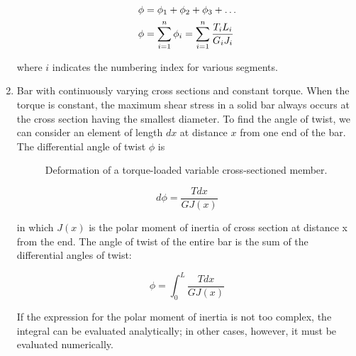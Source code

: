 \documentclass[
10pt,
a4paper,
openany,
svgnames,
]{book} %
\begin{document}
\begin{enumerate}
  \begin{equation}
    \begin{gathered}
      \phi  = {\phi _1} + {\phi _2} + {\phi _3} +  \ldots  \hfill \\
      \phi  = \sum\limits_{i = 1}^n {{\phi _i} = \sum\limits_{i = 1}^n {\dfrac{{{T_i}{L_i}}}{{{G_i}{J_i}}}} }  \hfill \\ 
    \end{gathered}
  \end{equation}
  
  where $i$ indicates the numbering index for various segments.
  
\item Bar with continuously varying cross sections and constant torque. When the torque is constant, the maximum shear stress in a solid bar always occurs at the cross section having the smallest diameter. To find the angle of twist, we can consider an element of length $dx$ at distance $x$ from one end of the bar. The differential angle of twist $\phi$ is
  
  \begin{figure}[h]
    \centering
    \caption{Deformation of a torque-loaded variable cross-sectioned member.}
  \end{figure}
  
  \[d\phi  = \frac{{Tdx}}{{G{J}(x)}}\]
  
  in which $J(x)$ is the polar moment of inertia of cross section at distance x from the end. The angle of twist of the entire bar is the sum of the differential angles of twist:
  
  \begin{equation}
    \phi  = \int_0^L \frac{Tdx}{G{J(x)}}
  \end{equation}
  
  If the expression for the polar moment of inertia is not too complex, the integral can be evaluated analytically; in other cases, however, it must be evaluated numerically.
  

\end{enumerate}
\end{document}
